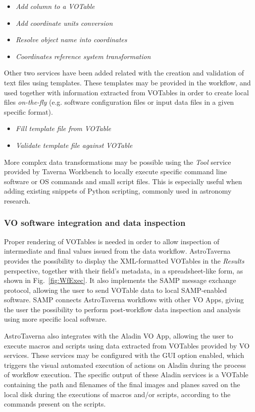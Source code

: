 \documentclass{aa}
\begin{document}
\begin{itemize}
\item \textit{Add column to a VOTable}
\item \textit{Add coordinate units conversion}
\item \textit{Resolve object name into coordinates} 
\item \textit{Coordinates reference system transformation}
\end{itemize}

Other two services have been added related with the creation and validation of text files using templates. These templates may be provided in the workflow, and used together with information extracted from VOTables in order to create local files \textit{on-the-fly} (e.g. software configuration files or input data files in a given specific format).

\begin{itemize}
\item \textit{Fill template file from VOTable}
\item \textit{Validate template file against VOTable}
\end{itemize}

More complex data transformations may be possible using the \textit{Tool} service provided by Taverna Workbench to locally execute specific command line software or OS commands and small script files. This is especially useful when adding existing snippets of Python scripting, commonly used in astronomy research.  

\subsubsection{VO software integration and data inspection}
\label{VOApps}

Proper rendering of VOTables is needed in order to allow inspection of intermediate and final values issued from the data workflow. AstroTaverna provides the possibility to display the XML-formatted VOTables in the \emph{Results} perspective, together with their field’s metadata, in a spreadsheet-like form, as shown in Fig.~\ref{fig:WfExec}. It also implements the SAMP message exchange protocol, allowing the user to send VOTable data to local SAMP-enabled software. SAMP connects AstroTaverna workflows with other VO Apps, giving the user the possibility to perform post-workflow data inspection and analysis using more specific local software.

AstroTaverna also integrates with the Aladin VO App, allowing the user to execute macros and scripts using data extracted from VOTables provided by VO services. These services may be configured with the GUI option enabled, which triggers the visual automated execution of actions on Aladin during the process of workflow execution. The specific output of these Aladin services is a VOTable containing the path and filenames of the final images and planes saved on the local disk during the executions of macros and/or scripts, according to the commands present on the scripts.
\end{document}
